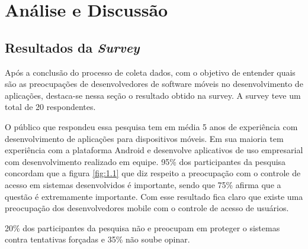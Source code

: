 \chapter{\label{chap:intro}Análise e Discussão}
 




\section{Resultados da \textit{Survey}}

Após a conclusão do processo de coleta dados, com o objetivo de entender quais são as preocupações de desenvolvedores de software móveis no desenvolvimento de aplicações, destaca-se nessa seção o resultado obtido na survey. A survey teve um total de 20 respondentes.

O público que respondeu essa pesquisa tem em média 5 anos de experiência com desenvolvimento de aplicações  para dispositivos móveis. Em sua maioria tem experiência com a plataforma Android e desenvolve aplicativos de uso empresarial com desenvolvimento realizado em equipe.
95{\%} dos participantes da pesquisa concordam que a figura \ref{fig:1.1} que diz respeito a preocupação com o controle de acesso em sistemas desenvolvidos é importante, sendo que 75{\%} afirma que a questão é extremamente importante. Com esse resultado fica claro que existe uma preocupação dos desenvolvedores mobile com o controle de acesso de usuários. 




20{\%} dos participantes da pesquisa não e preocupam em proteger o sistemas contra tentativas forçadas e 35{\%} não soube opinar.  




